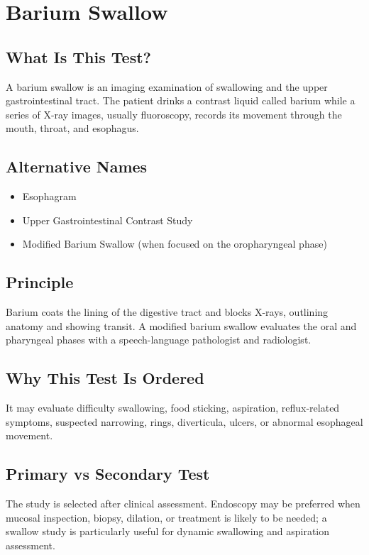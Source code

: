 \chapter{Barium Swallow}

\section*{What Is This Test?}
A barium swallow is an imaging examination of swallowing and the upper gastrointestinal tract. The patient drinks a contrast liquid called barium while a series of X-ray images, usually fluoroscopy, records its movement through the mouth, throat, and esophagus.

\section*{Alternative Names}
\begin{itemize}
  \item Esophagram
  \item Upper Gastrointestinal Contrast Study
  \item Modified Barium Swallow (when focused on the oropharyngeal phase)
\end{itemize}

\section*{Principle}
Barium coats the lining of the digestive tract and blocks X-rays, outlining anatomy and showing transit. A modified barium swallow evaluates the oral and pharyngeal phases with a speech-language pathologist and radiologist.

\section*{Why This Test Is Ordered}
It may evaluate difficulty swallowing, food sticking, aspiration, reflux-related symptoms, suspected narrowing, rings, diverticula, ulcers, or abnormal esophageal movement.

\section*{Primary vs Secondary Test}
The study is selected after clinical assessment. Endoscopy may be preferred when mucosal inspection, biopsy, dilation, or treatment is likely to be needed; a swallow study is particularly useful for dynamic swallowing and aspiration assessment.


